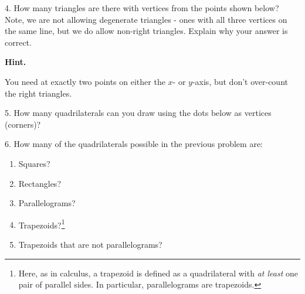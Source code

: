 \documentclass[10pt,]{book}
\theoremstyle{plain}
\theoremstyle{definition}
\numberwithin{equation}{chapter}
\begin{document}
\begin{exerciselist}
\par\smallskip
\item[4.]\hypertarget{exercise-72}{}
                How many triangles are there with vertices from the points shown below? Note, we are not allowing degenerate triangles - ones with all three vertices on the same line, but we do allow non-right triangles. Explain why your answer is correct.
\leavevmode%
\begin{figure}
\centering
{
}
\end{figure}
\par\smallskip
\par\smallskip
\noindent\textbf{Hint.}\hypertarget{hint-6}{}\quad

                You need at exactly two points on either the \(x\)- or \(y\)-axis, but don't over-count the right triangles.
            \item[5.]\hypertarget{exercise-73}{}
                How many quadrilaterals can you draw using the dots below as vertices (corners)?
\leavevmode%
\begin{figure}
\centering
{
}
\end{figure}
\par\smallskip
\item[6.]\hypertarget{exercise-74}{}
                How many of the quadrilaterals possible in the previous problem are:
              \leavevmode%
\begin{enumerate}[label=(\alph*)]
\item\hypertarget{li-266}{} Squares? %
\item\hypertarget{li-267}{} Rectangles? %
\item\hypertarget{li-268}{} Parallelograms? %
\item\hypertarget{li-269}{} Trapezoids?\footnote{Here, as in calculus, a trapezoid is defined as a quadrilateral with \emph{at least} one pair of parallel sides.  In particular, parallelograms are trapezoids.\label{fn-1}} %
\item\hypertarget{li-270}{} Trapezoids that are not parallelograms? %
\end{enumerate}


\end{exerciselist}
\end{document}
